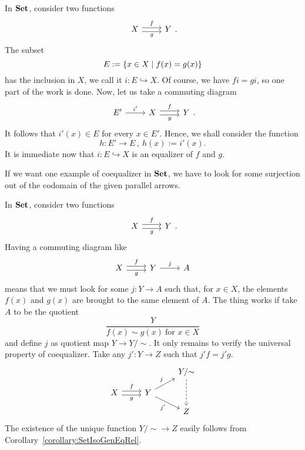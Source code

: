 \begin{example}
  In \(\mathbf{Set}\), consider two functions
  \[\begin{tikzcd}
      X \ar["f", r, shift left] \ar["g", r, shift right, swap] & Y
    \end{tikzcd} .\] The subset
  \[E := \left\{x \in X \mid f(x) = g(x)\right\}\] has the inclusion in \(X\), we
  call it \(i : E \hookrightarrow X\). Of course, we have \(fi = gi\), so one part
  of the work is done. Now, let us take a commuting diagram
  \[\begin{tikzcd}
      E' \ar["{i'}", r] & X \ar["f", r, shift left] \ar["g", r, shift
      right, swap] & Y
    \end{tikzcd} .\] It follows that \(i'(x) \in E\) for every
  \(x \in E'\). Hence, we shall consider the function
  \[h : E' \to E\,, \ h(x) := i'(x) .\] It is immediate now that
  \(i : E \hookrightarrow X\) is an equalizer of \(f\) and \(g\).
\end{example}

If we want one example of coequalizer in \(\mathbf{Set}\), we have to look for
some surjection out of the codomain of the given parallel arrows.

\begin{example}
  In \(\mathbf{Set}\), consider two functions
  \[\begin{tikzcd}
      X \ar["f", r, shift left] \ar["g", r, shift right, swap] & Y
    \end{tikzcd} .\] Having a commuting diagram like
  \[\begin{tikzcd}
      X \ar["f", r, shift left] \ar["g", r, shift right, swap] & Y
      \ar["j", r] & A
    \end{tikzcd}\] means that we must look for some \(j : Y \to A\) such
  that, for \(x \in X\), the elements \(f(x)\) and \(g(x)\) are brought
  to the same element of \(A\). The thing works if take \(A\) to be
  the quotient
  \[\frac{Y}{f(x) \sim g(x) \ \text{for } x \in X}\]
  and define \(j\) as quotient map \(Y \to Y{/}{\sim}\). It only remains to
  verify the universal property of coequalizer. Take any
  \(j' : Y \to Z\) such that \(j'f = j'g\).
  \[\begin{tikzcd}[row sep=small]
      & & Y{/}{\sim} \ar[dd, dashed] \\
      X \ar["f", r, shift left] \ar["g", r, shift right, swap] & Y \ar["j", ur] \ar["{j'}", dr, swap] \\
      & & Z
    \end{tikzcd}\] The existence of the unique function
  \(Y{/}{\sim} \to Z\) easily follows from
  Corollary~\ref{corollary:SetIsoGenEqRel}.
\end{example}

